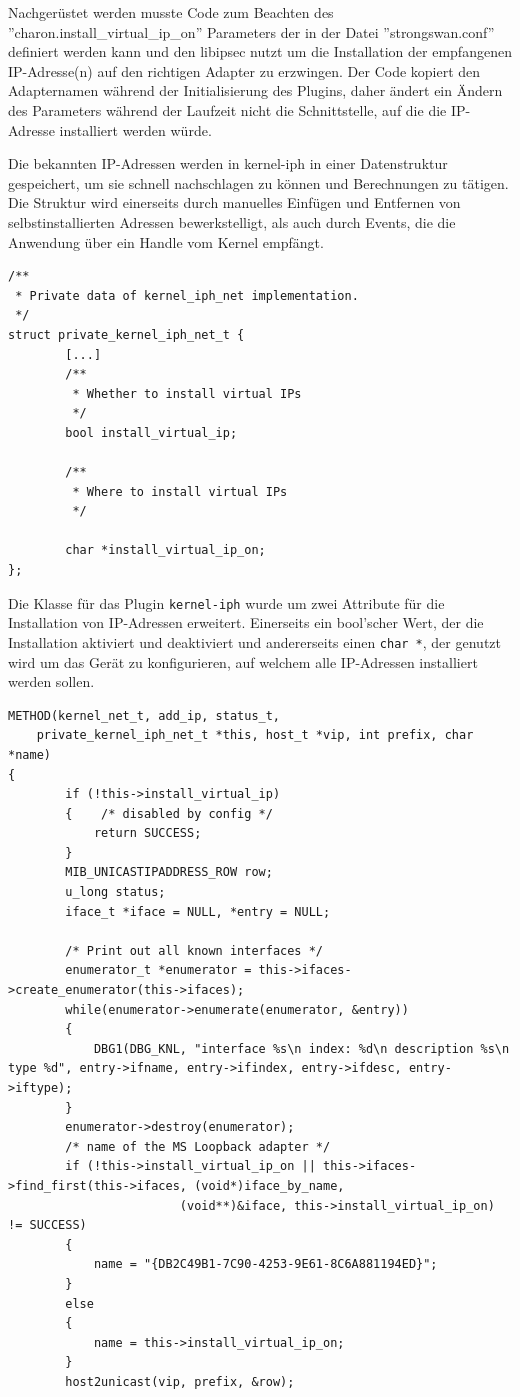 {Nachgerüstet werden musste Code zum Beachten des ''charon.install\_virtual\_ip\_on'' Parameters
der in der Datei ''strongswan.conf'' definiert werden kann und den libipsec nutzt um
die Installation der empfangenen IP-Adresse(n) auf den richtigen Adapter zu erzwingen.
Der Code kopiert den Adapternamen während der Initialisierung des Plugins, daher
ändert ein Ändern des Parameters während der Laufzeit nicht die Schnittstelle,
auf die die IP-Adresse installiert werden würde.

Die bekannten IP-Adressen werden in kernel-iph in einer Datenstruktur gespeichert,
um sie schnell nachschlagen zu können und Berechnungen zu tätigen. Die Struktur
wird einerseits durch manuelles Einfügen und Entfernen von selbstinstallierten Adressen
bewerkstelligt, als auch durch Events, die die Anwendung über ein Handle
vom Kernel empfängt.

\begin{lstlisting}[caption=Ergänzung zu private\_kernel\_iph\_net\_t,label=lst:kernel_iph]
/**
 * Private data of kernel_iph_net implementation.
 */
struct private_kernel_iph_net_t {
        [...]
        /**
         * Whether to install virtual IPs
         */
        bool install_virtual_ip;

        /**
         * Where to install virtual IPs
         */

        char *install_virtual_ip_on;
};
\end{lstlisting}

Die Klasse für das Plugin \texttt{kernel-iph} wurde um zwei Attribute für die Installation
von \ac{IP}-Adressen erweitert. Einerseits ein bool'scher Wert, der die Installation
aktiviert und deaktiviert und andererseits einen \texttt{char *}, der genutzt wird
um das Gerät zu konfigurieren, auf welchem alle \ac{IP}-Adressen installiert werden sollen.

\begin{lstlisting}[caption=Code für add\_ip,label=lst:kernel_iph_add_ip]
METHOD(kernel_net_t, add_ip, status_t,
    private_kernel_iph_net_t *this, host_t *vip, int prefix, char *name)
{
        if (!this->install_virtual_ip)
        {    /* disabled by config */
            return SUCCESS;
        }
        MIB_UNICASTIPADDRESS_ROW row;
        u_long status;
        iface_t *iface = NULL, *entry = NULL;

        /* Print out all known interfaces */
        enumerator_t *enumerator = this->ifaces->create_enumerator(this->ifaces);
        while(enumerator->enumerate(enumerator, &entry))
        {
            DBG1(DBG_KNL, "interface %s\n index: %d\n description %s\n type %d", entry->ifname, entry->ifindex, entry->ifdesc, entry->iftype);
        }
        enumerator->destroy(enumerator);
        /* name of the MS Loopback adapter */
        if (!this->install_virtual_ip_on || this->ifaces->find_first(this->ifaces, (void*)iface_by_name,
                        (void**)&iface, this->install_virtual_ip_on) != SUCCESS)
        {
            name = "{DB2C49B1-7C90-4253-9E61-8C6A881194ED}";
        }
        else
        {
            name = this->install_virtual_ip_on;
        }
        host2unicast(vip, prefix, &row);


\end{lstlisting}}
